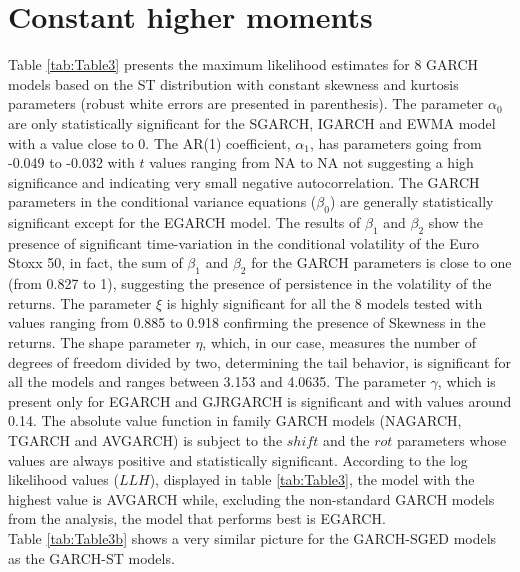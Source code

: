 \documentclass[a4paper, nobind]{templates/ociamthesis}
\begin{document}
\newpage

\hypertarget{constant-higher-moments}{%
\section{Constant higher moments}\label{constant-higher-moments}}

\noindent Table \ref{tab:Table3} presents the maximum likelihood estimates for 8 GARCH models based on the ST distribution with constant skewness and kurtosis parameters (robust white errors are presented in parenthesis). The parameter \(\alpha_0\) are only statistically significant for the SGARCH, IGARCH and EWMA model with a value close to 0. The AR(1) coefficient, \(\alpha_1\), has parameters going from -0.049 to -0.032 with \(t\) values ranging from NA to NA not suggesting a high significance and indicating very small negative autocorrelation. The GARCH parameters in the conditional variance equations (\(\beta_0\)) are generally statistically significant except for the EGARCH model. The results of \(\beta_1\) and \(\beta_2\) show the presence of significant time-variation in the conditional volatility of the Euro Stoxx 50, in fact, the sum of \(\beta_1\) and \(\beta_2\) for the GARCH parameters is close to one (from 0.827 to 1), suggesting the presence of persistence in the volatility of the returns. The parameter \(\xi\) is highly significant for all the 8 models tested with values ranging from 0.885 to 0.918 confirming the presence of Skewness in the returns. The shape parameter \(\eta\), which, in our case, measures the number of degrees of freedom divided by two, determining the tail behavior, is significant for all the models and ranges between 3.153 and 4.0635. The parameter \(\gamma\), which is present only for EGARCH and GJRGARCH is significant and with values around 0.14. The absolute value function in family GARCH models (NAGARCH, TGARCH and AVGARCH) is subject to the \(shift\) and the \(rot\) parameters whose values are always positive and statistically significant. According to the log likelihood values (\(LLH\)), displayed in table \ref{tab:Table3}, the model with the highest value is AVGARCH while, excluding the non-standard GARCH models from the analysis, the model that performs best is EGARCH.~\\

\noindent Table \ref{tab:Table3b} shows a very similar picture for the GARCH-SGED models as the GARCH-ST models.
\end{document}
